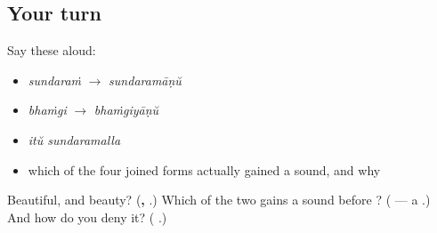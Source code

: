 \subsection*{Your turn}
Say these aloud:

\begin{itemize}
\raggedright
  \item \emph{sundaraṁ} $\to$ \emph{sundaramāṇŭ}
  \item \emph{bhaṁgi} $\to$ \emph{bhaṁgiyāṇŭ}
  \item \emph{itŭ sundaramalla}
  \item which of the four joined forms actually gained a sound, and why
\end{itemize}

\begin{tcolorbox}[breakable,colback=teal!4,colframe=teal!35!black,title={Before you move on}]
Beautiful, and beauty? (\textbf{, }.) Which of the two gains a sound before \textbf{}? (\textbf{} — a \textbf{}.) And how do you deny it? (\textbf{ }.)
\end{tcolorbox}
